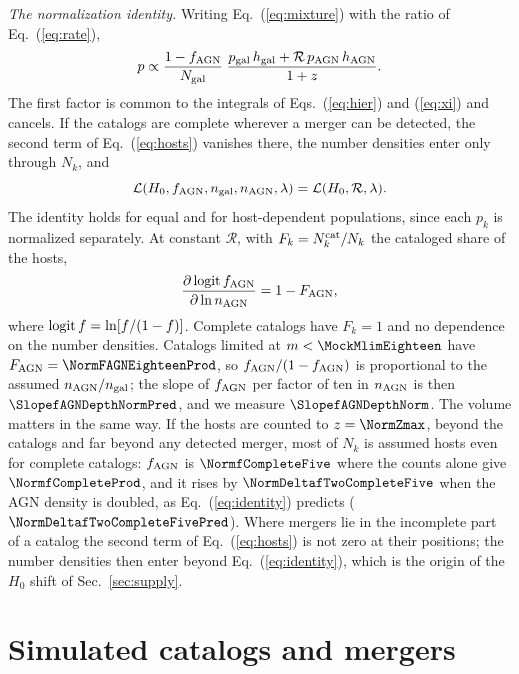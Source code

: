 \documentclass[aps,prd,reprint,superscriptaddress,nofootinbib,nolongbibliography,floatfix]{revtex4-2}
\newcommand{\fagn}{f_{\rm AGN}}
\newcommand{\RR}{\mathcal{R}}
\begin{document}
\textit{The normalization identity.}
Writing Eq.~(\ref{eq:mixture}) with the ratio of Eq.~(\ref{eq:rate}),
\begin{equation}
p\propto\frac{1-\fagn}{N_{\rm gal}}\;\frac{p_{\rm gal}\,h_{\rm gal}+\RR\,p_{\rm AGN}\,h_{\rm AGN}}{1+z}.
\label{eq:factor}
\end{equation}
The first factor is common to the integrals of Eqs.~(\ref{eq:hier}) and (\ref{eq:xi}) and cancels.
If the catalogs are complete wherever a merger can be detected, the second term of Eq.~(\ref{eq:hosts}) vanishes there, the number densities enter only through $N_k$, and
\begin{equation}
\mathcal{L}(H_0,\fagn,n_{\rm gal},n_{\rm AGN},\lambda)=\mathcal{L}(H_0,\RR,\lambda).
\label{eq:identity}
\end{equation}
The identity holds for equal and for host-dependent populations, since each $p_k$ is normalized separately.
At constant $\RR$, with $F_k=N_k^{\rm cat}/N_k$ the cataloged share of the hosts,
\begin{equation}
\frac{\partial\,{\rm logit}\,\fagn}{\partial\ln n_{\rm AGN}}=1-F_{\rm AGN},
\label{eq:slope}
\end{equation}
where ${\rm logit}\,f=\ln[f/(1-f)]$.
Complete catalogs have $F_k=1$ and no dependence on the number densities.
Catalogs limited at $m<\MockMlimEighteen$ have $F_{\rm AGN}=\NormFAGNEighteenProd$, so $\fagn/(1-\fagn)$ is proportional to the assumed $n_{\rm AGN}/n_{\rm gal}$; the slope of $\fagn$ per factor of ten in $n_{\rm AGN}$ is then $\SlopefAGNDepthNormPred$, and we measure $\SlopefAGNDepthNorm$.
The volume matters in the same way.
If the hosts are counted to $z=\NormZmax$, beyond the catalogs and far beyond any detected merger, most of $N_k$ is assumed hosts even for complete catalogs: $\fagn$ is $\NormfCompleteFive$ where the counts alone give $\NormfCompleteProd$, and it rises by $\NormDeltafTwoCompleteFive$ when the AGN density is doubled, as Eq.~(\ref{eq:identity}) predicts ($\NormDeltafTwoCompleteFivePred$).
Where mergers lie in the incomplete part of a catalog the second term of Eq.~(\ref{eq:hosts}) is not zero at their positions; the number densities then enter beyond Eq.~(\ref{eq:identity}), which is the origin of the $H_0$ shift of Sec.~\ref{sec:supply}.

\section{Simulated catalogs and mergers}
\label{app:sims}
\end{document}
